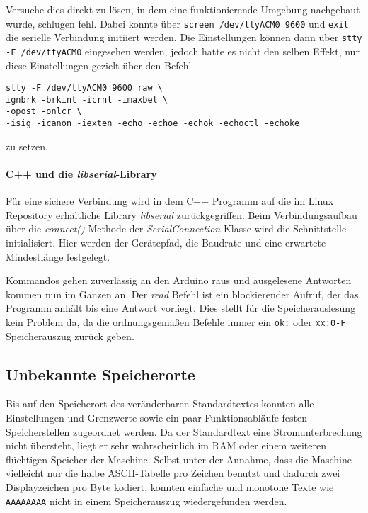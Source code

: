 Versuche dies direkt zu lösen, in dem eine funktionierende Umgebung nachgebaut wurde, schlugen fehl.
Dabei konnte über \texttt{screen /dev/ttyACM0 9600} und \texttt{exit} die serielle Verbindung initiiert werden.
Die Einstellungen können dann über \texttt{stty -F /dev/ttyACM0} eingesehen werden, jedoch hatte es nicht den selben Effekt, nur diese Einstellungen gezielt über den Befehl
\begin{lstlisting}[label=lst:stty,caption={stty zum setzen der Verbindungseinstellungen}]
stty -F /dev/ttyACM0 9600 raw \
ignbrk -brkint -icrnl -imaxbel \
-opost -onlcr \
-isig -icanon -iexten -echo -echoe -echok -echoctl -echoke
\end{lstlisting}
zu setzen.

\paragraph{C++ und die \textit{libserial}-Library}
Für eine sichere Verbindung wird in dem C++ Programm auf die im Linux Repository erhältliche Library \textit{libserial} zurückgegriffen.
Beim Verbindungsaufbau über die \textit{connect()} Methode der \textit{SerialConnection} Klasse wird die Schnittstelle initialisiert.
Hier werden der Gerätepfad, die Baudrate und eine erwartete Mindestlänge festgelegt.

Kommandos gehen zuverlässig an den Arduino raus und ausgelesene Antworten kommen nun im Ganzen an.
Der \textit{read} Befehl ist ein blockierender Aufruf, der das Programm anhält bis eine Antwort vorliegt.
Dies stellt für die Speicherauslesung kein Problem da, da die ordnungsgemäßen Befehle immer ein \texttt{ok:} oder \texttt{xx:0-F} Speicherauszug zurück geben.

\subsection{Unbekannte Speicherorte}\label{subsec:UnbekannteSpeicherorte}
Bis auf den Speicherort des veränderbaren Standardtextes konnten alle Einstellungen und Grenzwerte sowie ein paar Funktionsabläufe festen Speicherstellen zugeordnet werden.
Da der Standardtext eine Stromunterbrechung nicht übersteht, liegt er sehr wahrscheinlich im \ac{RAM} oder einem weiteren flüchtigen Speicher der Maschine.
Selbst unter der Annahme, dass die Maschine vielleicht nur die halbe \ac{ASCII}-Tabelle pro Zeichen benutzt und dadurch zwei Displayzeichen pro Byte kodiert, konnten einfache und monotone Texte wie \texttt{AAAAAAAA} nicht in einem Speicherauszug wiedergefunden werden.

